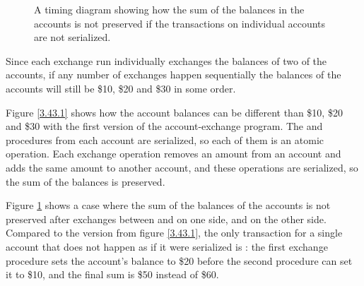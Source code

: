 \begin{exe}[3.43]
\begin{figure}
        \caption{A timing diagram showing how the sum of the balances in the 
        accounts is not preserved if the transactions on individual accounts are 
        not serialized.}
        \label{3.43.2}
    \end{figure}

    Since each exchange run individually exchanges the balances of two of the 
    accounts, if any number of exchanges happen sequentially the balances of the 
    accounts will still be \$10, \$20 and \$30 in some order.

    Figure \ref{3.43.1} shows how the account balances can be different than 
    \$10, \$20 and \$30 with the first version of the account-exchange program. 
    The  and  procedures from each account are 
    serialized, so each of them is an atomic operation. Each exchange operation 
    removes an amount from an account and adds the same amount to another 
    account, and these operations are serialized, so the sum of the balances is 
    preserved.

    Figure \ref{3.43.2} shows a case where the sum of the balances of the 
    accounts is not preserved after exchanges between  and  on 
    one side,  and  on the other side. Compared to the version 
    from figure \ref{3.43.1}, the only transaction for a single account that 
    does not happen as if it were serialized is : the 
    first exchange procedure sets the account’s balance to \$20 before the 
    second procedure can set it to \$10, and the final sum is \$50 instead of 
    \$60.
\end{exe}

